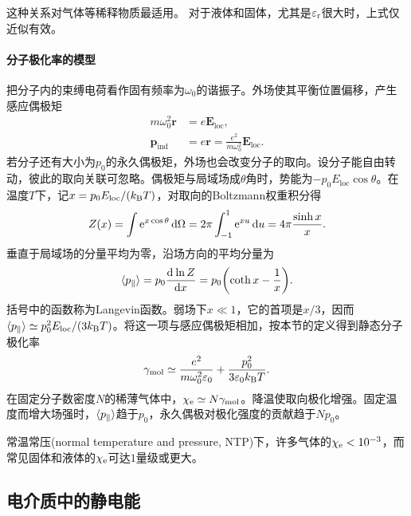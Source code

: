 \begin{remark}
    这种关系对气体等稀释物质最适用。
    对于液体和固体，尤其是$\varepsilon_\mathrm r$很大时，上式仅近似有效。
\end{remark}

\paragraph{分子极化率的模型}
把分子内的束缚电荷看作固有频率为$\omega_0$的谐振子。外场使其平衡位置偏移，产生感应偶极矩
\begin{align*}
    m\omega_0^2\bm r &= e\bm E_{\mathrm{loc}},\\
    \bm p_{\mathrm{ind}} &= e\bm r = \frac{e^2}{m\omega_0^2}\bm E_{\mathrm{loc}}.
\end{align*}
若分子还有大小为$p_0$的永久偶极矩，外场也会改变分子的取向。设分子能自由转动，彼此的取向关联可忽略。偶极矩与局域场成$\theta$角时，势能为$-p_0E_{\mathrm{loc}}\cos\theta$。在温度$T$下，记$x = p_0E_{\mathrm{loc}}/(k_{\mathrm{B}} T)$，对取向的Boltzmann权重积分得
\[
    Z(x) = \int\mathop{}\!\mathrm{e}^{x\cos\theta}\mathop{}\!\mathrm{d}\Omega
    = 2\pi\int_{-1}^1\mathop{}\!\mathrm{e}^{xu}\mathop{}\!\mathrm{d} u
    = 4\pi\frac{\sinh x}{x}.
\]
垂直于局域场的分量平均为零，沿场方向的平均分量为
\begin{equation}
    \langle p_\parallel\rangle = p_0\frac{\mathop{}\!\mathrm{d}^{}\ln Z}{\mathrm{d}{x}^{}}
    = p_0\biggl(\coth x - \frac1x\biggr).
\end{equation}
括号中的函数称为Langevin函数。弱场下$x \ll 1$，它的首项是$x/3$，因而$\langle p_\parallel\rangle \simeq p_0^2 E_{\mathrm{loc}}/(3k_{\mathrm{B}} T)$。将这一项与感应偶极矩相加，按本节的定义得到静态分子极化率
\begin{equation}
    \gamma_{\mathrm{mol}} \simeq \frac{e^2}{m\omega_0^2\varepsilon_0} + \frac{p_0^2}{3\varepsilon_0k_{\mathrm{B}} T}.
\end{equation}
在固定分子数密度$N$的稀薄气体中，$\chi_\mathrm e \simeq N\gamma_{\mathrm{mol}}$。降温使取向极化增强。固定温度而增大场强时，$\langle p_\parallel\rangle$趋于$p_0$，永久偶极对极化强度的贡献趋于$Np_0$。

\begin{example}
    {}{}
    常温常压(normal temperature and pressure, NTP)下，许多气体的$\chi_\mathrm e < 10^{-3}$，而常见固体和液体的$\chi_\mathrm e$可达$1$量级或更大。
\end{example}

\subsection{电介质中的静电能}
\label{ssec:electrostatic energy in dielectric media}

